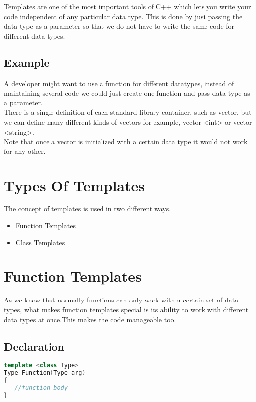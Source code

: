 \documentclass[11pt,fleqn]{book} %
\begin{document}
 Templates are one of the most important tools of C++ which lets you write your code independent of any particular data type. This is done by just passing the data type as a parameter so that we do not have to write the same code for different data types.
 
\subsection{Example}
A developer might want to use a function for different datatypes, instead of maintaining several code we could just create one function and pass data type as a parameter.\\
There is a single definition of each standard library container, such as vector, but we can define many different kinds of vectors for example, vector <int> or vector <string>.\\
Note that once a vector is initialized with a certain data type it would not work for any other.

\section{Types Of Templates}

The concept of templates is used in two different ways.\\
\begin{itemize}
\item Function Templates 
\item Class Templates
\end{itemize}

\section{Function Templates}

As we know that normally functions can only work with a certain set of data types, what makes function templates special is its ability to work with different data types at once.This makes the code manageable too.
\newpage
\subsection{Declaration}
\begin{lstlisting}[language=C++, caption= Declaration Of Function Templates]
template <class Type>
Type Function(Type arg)
{
   //function body
}
\end{lstlisting}
\end{document}
